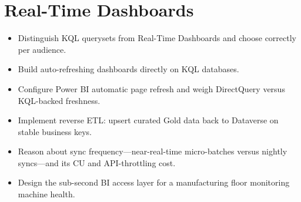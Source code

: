 \chapter{Real-Time Dashboards}
%

\begin{objectives}
\begin{itemize}
    \item Distinguish KQL querysets from Real-Time Dashboards and choose correctly per audience.
    \item Build auto-refreshing dashboards directly on KQL databases.
    \item Configure Power BI automatic page refresh and weigh DirectQuery versus KQL-backed freshness.
    \item Implement reverse ETL: upsert curated Gold data back to Dataverse on stable business keys.
    \item Reason about sync frequency---near-real-time micro-batches versus nightly syncs---and its CU and API-throttling cost.
    \item Design the sub-second BI access layer for a manufacturing floor monitoring machine health.
\end{itemize}
\end{objectives}

